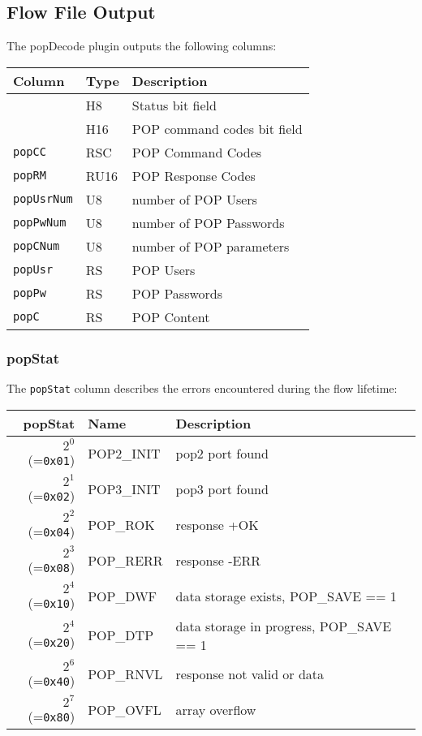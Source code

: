 \documentclass[documentation]{subfiles}
\begin{document}
\subsection{Flow File Output}
The popDecode plugin outputs the following columns:
\begin{longtable}{lll}
    \toprule
    {\bf Column} & {\bf Type} & {\bf Description} \\
    \midrule\endhead%
    {\tt \nameref{popStat}} & H8   & Status bit field\\
    {\tt \nameref{popCBF}}  & H16  & POP command codes bit field \\
    {\tt popCC}             & RSC  & POP Command Codes \\
    {\tt popRM}             & RU16 & POP Response Codes \\
    {\tt popUsrNum}         & U8   & number of POP Users \\
    {\tt popPwNum}          & U8   & number of POP Passwords \\
    {\tt popCNum}           & U8   & number of POP parameters \\
    {\tt popUsr}            & RS   & POP Users \\
    {\tt popPw}             & RS   & POP Passwords \\
    {\tt popC}              & RS   & POP Content \\
    \bottomrule
\end{longtable}

\subsubsection{popStat}\label{popStat}
The {\tt popStat} column describes the errors encountered during the flow lifetime:
\begin{longtable}{rll}
    \toprule
    {\bf popStat} & {\bf Name} & {\bf Description} \\
    \midrule\endhead%
    $2^0$ (={\tt 0x01}) & POP2\_INIT & pop2 port found \\
    $2^1$ (={\tt 0x02}) & POP3\_INIT & pop3 port found \\
    $2^2$ (={\tt 0x04}) & POP\_ROK & response +OK \\
    $2^3$ (={\tt 0x08}) & POP\_RERR & response -ERR \\
    $2^4$ (={\tt 0x10}) & POP\_DWF & data storage exists, POP\_SAVE == 1\\
    $2^4$ (={\tt 0x20}) & POP\_DTP & data storage in progress, POP\_SAVE == 1\\
    $2^6$ (={\tt 0x40}) & POP\_RNVL & response not valid or data \\
    $2^7$ (={\tt 0x80}) & POP\_OVFL & array overflow \\
    \bottomrule
\end{longtable}
\end{document}
